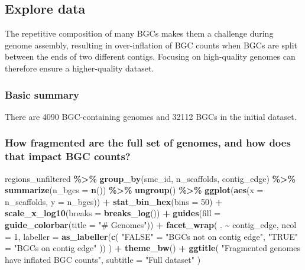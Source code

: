 \documentclass[
]{article}
\newenvironment{Shaded}{\begin{snugshade}}{\end{snugshade}}
\newcommand{\AttributeTok}[1]{\textcolor[rgb]{0.13,0.29,0.53}{#1}}
\newcommand{\DecValTok}[1]{\textcolor[rgb]{0.00,0.00,0.81}{#1}}
\newcommand{\FunctionTok}[1]{\textcolor[rgb]{0.13,0.29,0.53}{\textbf{#1}}}
\newcommand{\NormalTok}[1]{#1}
\newcommand{\OtherTok}[1]{\textcolor[rgb]{0.56,0.35,0.01}{#1}}
\newcommand{\SpecialCharTok}[1]{\textcolor[rgb]{0.81,0.36,0.00}{\textbf{#1}}}
\newcommand{\StringTok}[1]{\textcolor[rgb]{0.31,0.60,0.02}{#1}}
\begin{document}
\subsection{Explore data}\label{explore-data}

The repetitive composition of many BGCs makes them a challenge during
genome assembly, resulting in over-inflation of BGC counts when BGCs are
split between the ends of two different contigs. Focusing on
high-quality genomes can therefore ensure a higher-quality dataset.

\subsubsection{Basic summary}\label{basic-summary}

There are 4090 BGC-containing genomes and 32112 BGCs in the initial
dataset.

\subsubsection{How fragmented are the full set of genomes, and how does
that impact BGC
counts?}\label{how-fragmented-are-the-full-set-of-genomes-and-how-does-that-impact-bgc-counts}

\begin{Shaded}
\begin{Highlighting}[]
\NormalTok{regions\_unfiltered }\SpecialCharTok{\%\textgreater{}\%}
  \FunctionTok{group\_by}\NormalTok{(smc\_id, n\_scaffolds, contig\_edge) }\SpecialCharTok{\%\textgreater{}\%}
  \FunctionTok{summarize}\NormalTok{(}\AttributeTok{n\_bgcs =} \FunctionTok{n}\NormalTok{()) }\SpecialCharTok{\%\textgreater{}\%}
  \FunctionTok{ungroup}\NormalTok{() }\SpecialCharTok{\%\textgreater{}\%}
  \FunctionTok{ggplot}\NormalTok{(}\FunctionTok{aes}\NormalTok{(}\AttributeTok{x =}\NormalTok{ n\_scaffolds, }\AttributeTok{y =}\NormalTok{ n\_bgcs)) }\SpecialCharTok{+}
  \FunctionTok{stat\_bin\_hex}\NormalTok{(}\AttributeTok{bins =} \DecValTok{50}\NormalTok{) }\SpecialCharTok{+}
  \FunctionTok{scale\_x\_log10}\NormalTok{(}\AttributeTok{breaks =} \FunctionTok{breaks\_log}\NormalTok{()) }\SpecialCharTok{+}
  \FunctionTok{guides}\NormalTok{(}\AttributeTok{fill =} \FunctionTok{guide\_colorbar}\NormalTok{(}\AttributeTok{title =} \StringTok{"\# Genomes"}\NormalTok{)) }\SpecialCharTok{+}
  \FunctionTok{facet\_wrap}\NormalTok{(}
\NormalTok{    . }\SpecialCharTok{\textasciitilde{}}\NormalTok{ contig\_edge, }
    \AttributeTok{ncol =} \DecValTok{1}\NormalTok{, }
    \AttributeTok{labeller =} \FunctionTok{as\_labeller}\NormalTok{(}\FunctionTok{c}\NormalTok{(}
      \StringTok{"FALSE"} \OtherTok{=} \StringTok{"BGCs not on contig edge"}\NormalTok{, }
      \StringTok{"TRUE"} \OtherTok{=} \StringTok{"BGCs on contig edge"}
\NormalTok{    ))}
\NormalTok{  ) }\SpecialCharTok{+}
  \FunctionTok{theme\_bw}\NormalTok{() }\SpecialCharTok{+}
  \FunctionTok{ggtitle}\NormalTok{(}
    \StringTok{"Fragmented genomes have inflated BGC counts"}\NormalTok{, }
    \AttributeTok{subtitle =} \StringTok{"Full dataset"}
\NormalTok{  )}
\end{Highlighting}
\end{Shaded}
\end{document}
